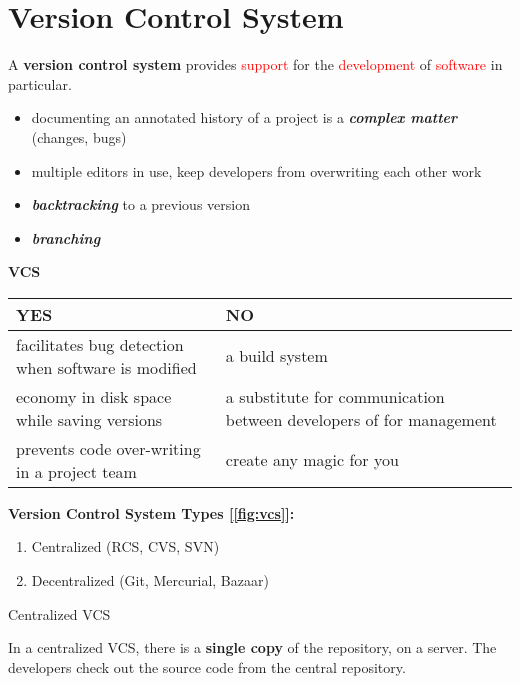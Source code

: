 \newpage
\section{Version Control System}
\begin{multicols*}{2}
A \textbf{version control system} provides \textcolor{red}{support} for the \textcolor{red}{development} of \textcolor{red}{software} in particular.
\begin{itemize}
\item documenting an annotated history of a project is a \textbf{\textit{complex matter}} (changes, bugs)
\item multiple editors in use, keep developers from overwriting each other work
\item \textbf{\textit{backtracking}} to a previous version
\item \textbf{\textit{branching}}
\end{itemize}
\begin{center}
\textcolor{b}{\textbf{VCS}}
\begin{Table}
\begin{tabular}{K{.45\textwidth}|K{.45\textwidth}}
\hline
\textbf{YES} & \textbf{NO}\\[.4em]
\hline
facilitates \textcolor{g}{bug detection} when software is modified & \vspace{0.2em} a \textcolor{g}{build} system\\[.4em]
\hline
\vspace{0.6em}\textcolor{g}{economy} in disk space while saving versions & a \textcolor{g}{substitute} for communication between developers of for management\\[.4em]
\hline
\textcolor{g}{prevents code over-writing} in a project team & \textcolor{g}{create any magic} for you\\[.4em]
\hline
\end{tabular}
\label{tbl_ex}
\end{Table}
\end{center}

\textbf{Version Control System Types [\ref{fig:vcs}]:}
\begin{enumerate}
\item Centralized (RCS, CVS, SVN)
\item Decentralized (Git, Mercurial, Bazaar)
\end{enumerate}

\textcolor{b}{Centralized VCS}

In a centralized VCS, there is a \textbf{single copy} of the repository, on a server. The developers check out the source code from the central repository. 


\end{multicols*}
